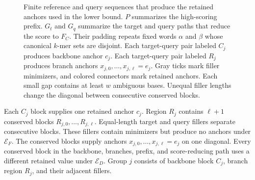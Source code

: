\begin{figure}[H]
\caption{Finite reference and query sequences that produce the retained
anchors used in the lower bound. \(P\) summarizes the high-scoring prefix.
\(G_t\) and \(G_q\) summarize the target and query paths that reduce the score
to \(F_C\). Their padding repeats fixed words \(\alpha\) and \(\beta\) whose
canonical \(k\)-mer sets are disjoint. Each target-query pair labeled \(C_j\)
produces backbone anchor \(c_j\). Each target-query pair labeled \(R_j\)
produces branch anchors
\(x_{j,0},\ldots,x_{j,\ell}=e_j\). Gray ticks mark filler minimizers, and
colored connectors mark retained anchors. Each small gap contains at least
\(w\) ambiguous bases. Unequal filler lengths change the diagonal between
consecutive conserved blocks.}
\label{fig:chaining-quadratic-sequence-template}
\end{figure}

Each \(C_j\) block supplies one retained anchor \(c_j\). Region \(R_j\)
contains \(\ell+1\) conserved blocks \(R_{j,0},\ldots,R_{j,\ell}\).
Equal-length target and query fillers separate consecutive blocks. These
fillers contain minimizers but produce no anchors under \(\mathcal E_F\).
The conserved blocks supply anchors
\(x_{j,0},\ldots,x_{j,\ell}=e_j\) on one diagonal. Every conserved block in
the backbone, branches, prefix, and score-reducing path uses a different
retained value under \(\mathcal E_D\).
Group \(j\) consists of backbone block \(C_j\), branch region \(R_j\), and
their adjacent fillers.

